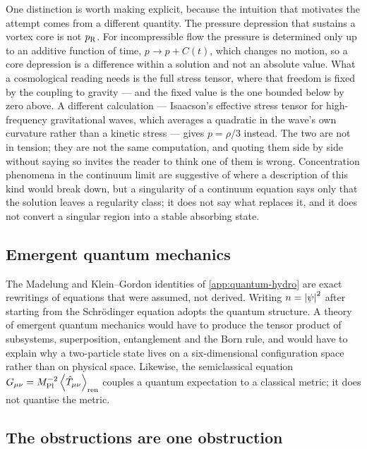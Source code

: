 One distinction is worth making explicit, because the intuition that motivates
the attempt comes from a different quantity. The pressure depression that
sustains a vortex core is not $p_{\rm R}$. For incompressible flow the pressure
is determined only up to an additive function of time, $p\to p+C(t)$, which
changes no motion, so a core depression is a difference within a solution and
not an absolute value. What a cosmological reading needs is the full stress
tensor, where that freedom is fixed by the coupling to gravity --- and the
fixed value is the one bounded below by zero above. A different
calculation --- Isaacson's effective stress tensor for high-frequency
gravitational waves, which averages a quadratic in the wave's own curvature
rather than a kinetic stress --- gives $p=\rho/3$ instead. The two are not in
tension; they are not the same computation, and quoting them side by side
without saying so invites the reader to think one of them is wrong. Concentration phenomena in the continuum limit are suggestive of
where a description of this kind would break down, but a singularity of a
continuum equation says only that the solution leaves a regularity class; it
does not say what replaces it, and it does not convert a singular region into a
stable absorbing state.

\subsection{Emergent quantum mechanics}\label{sec:outlook-quantum}

The Madelung and Klein--Gordon identities of \cref{app:quantum-hydro} are exact
rewritings of equations that were assumed, not derived. Writing $n=\left|\psi\right|^2$
after starting from the Schr\"odinger equation adopts the quantum structure. A
theory of emergent quantum mechanics would have to produce the tensor product
of subsystems, superposition, entanglement and the Born rule, and would have to
explain why a two-particle state lives on a six-dimensional configuration space
rather than on physical space. Likewise, the semiclassical equation
$G_{\mu\nu}=M_{\mathrm{Pl}}^{-2}\left\langle \hat T_{\mu\nu} \right\rangle_{\rm ren}$ couples a quantum expectation to
a classical metric; it does not quantise the metric.

\subsection{The obstructions are one obstruction}
\label{sec:outlook-one-obstruction}


